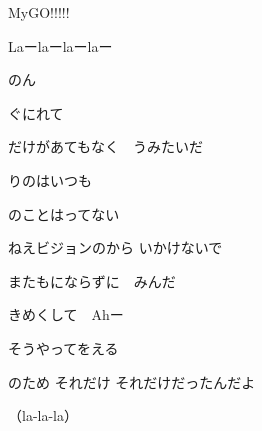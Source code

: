 \documentclass[a4paper,tate,twocolumn,12pt]{ltjtarticle}
\begin{document}
\thispagestyle{empty}

\begin{center}
{\LARGE {}}

{\large MyGO!!!!!}
\end{center}

\vspace{1em}

\begin{flushleft}

\noindent\begin{minipage}{\linewidth}
Laーlaーlaーlaー
\end{minipage}

\vspace{2em}

\noindent\begin{minipage}{\linewidth}
のん

ぐにれて

だけがあてもなく　うみたいだ
\end{minipage}

\vspace{2em}

\noindent\begin{minipage}{\linewidth}
りのはいつも

のことはってない

ねえビジョンのから いかけないで
\end{minipage}

\vspace{2em}

\noindent\begin{minipage}{\linewidth}
またもにならずに　みんだ

きめくして　Ahー

そうやってをえる
\end{minipage}

\vspace{2em}

\noindent\begin{minipage}{\linewidth}
のため それだけ それだけだったんだよ

（la-la-la）


\end{minipage}
\end{flushleft}
\end{document}
